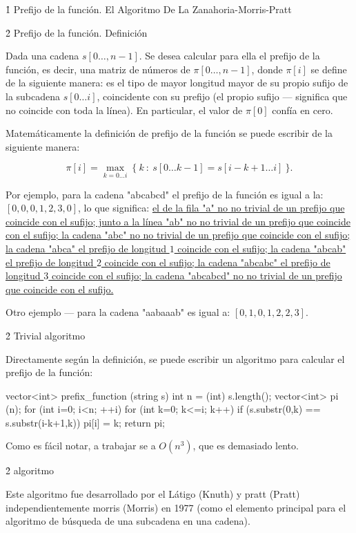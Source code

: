 \h1{ Prefijo de la función. El Algoritmo De La Zanahoria-Morris-Pratt }


\h2{ Prefijo de la función. Definición }

Dada una cadena $s[0 \ldots, n-1]$. Se desea calcular para ella el prefijo de la función, es decir, una matriz de números de $\pi[0 \ldots, n-1]$, donde $\pi[i]$ se define de la siguiente manera: es el tipo de mayor longitud mayor de su propio sufijo de la subcadena $s[0 \ldots i]$, coincidente con su prefijo (el propio sufijo --- significa que no coincide con toda la línea). En particular, el valor de $\pi[0]$ confía en cero.

Matemáticamente la definición de prefijo de la función se puede escribir de la siguiente manera:

$$ \pi[i] = \max_{k=0 \ldots i} ~ \{ ~ k ~ : ~ s[0 \ldots k-1] = s[i-k+1 \ldots i] ~ \}. $$

Por ejemplo, para la cadena "abcabcd" el prefijo de la función es igual a la: $[0, 0, 0, 1, 2, 3, 0]$, lo que significa:
\ul{
\li el de la fila "a" no no trivial de un prefijo que coincide con el sufijo;
\li junto a la línea "ab" no no trivial de un prefijo que coincide con el sufijo;
\li la cadena "abc" no no trivial de un prefijo que coincide con el sufijo;
\li la cadena "abca" el prefijo de longitud $1$ coincide con el sufijo;
\li la cadena "abcab" el prefijo de longitud $2$ coincide con el sufijo;
\li la cadena "abcabc" el prefijo de longitud $3$ coincide con el sufijo;
\li la cadena "abcabcd" no no trivial de un prefijo que coincide con el sufijo.
}

Otro ejemplo --- para la cadena "aabaaab" es igual a: $[0, 1, 0, 1, 2, 2, 3]$.


\h2{ Trivial algoritmo }

Directamente según la definición, se puede escribir un algoritmo para calcular el prefijo de la función:

\code
vector<int> prefix_function (string s) {
int n = (int) s.length();
vector<int> pi (n);
for (int i=0; i<n; ++i)
for (int k=0; k<=i; k++)
if (s.substr(0,k) == s.substr(i-k+1,k))
pi[i] = k;
return pi;
}
\endcode

Como es fácil notar, a trabajar se a $O(n^3)$, que es demasiado lento.


\h2{ algoritmo }

Este algoritmo fue desarrollado por el Látigo (Knuth) y pratt (Pratt) independientemente morris (Morris) en 1977 (como el elemento principal para el algoritmo de búsqueda de una subcadena en una cadena).

